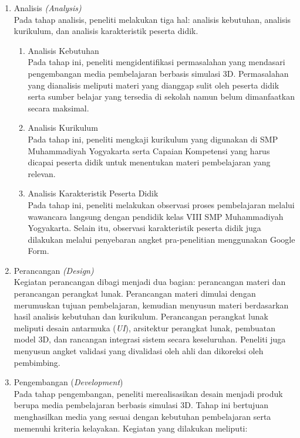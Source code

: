 \begin{enumerate}
    \item Analisis \textit{(Analysis)}\\
    \hspace*{1cm}Pada tahap analisis, peneliti melakukan tiga hal: analisis kebutuhan, analisis kurikulum, dan analisis karakteristik peserta didik.
    \begin{enumerate}
        \item Analisis Kebutuhan\\
        \hspace*{1cm}Pada tahap ini, peneliti mengidentifikasi permasalahan yang mendasari pengembangan media pembelajaran berbasis simulasi 3D. Permasalahan yang dianalisis meliputi materi yang dianggap sulit oleh peserta didik serta sumber belajar yang tersedia di sekolah namun belum dimanfaatkan secara maksimal.
        \item Analisis Kurikulum\\
        \hspace*{1cm}Pada tahap ini, peneliti mengkaji kurikulum yang digunakan di SMP Muhammadiyah Yogyakarta serta Capaian Kompetensi yang harus dicapai peserta didik untuk menentukan materi pembelajaran yang relevan.
        \item Analisis Karakteristik Peserta Didik\\
        \hspace*{1cm}Pada tahap ini, peneliti melakukan observasi proses pembelajaran melalui wawancara langsung dengan pendidik kelas VIII SMP Muhammadiyah Yogyakarta. Selain itu, observasi karakteristik peserta didik juga dilakukan melalui penyebaran angket pra-penelitian menggunakan Google Form.
    \end{enumerate}
    \item Perancangan \textit{(Design)}\\
    \hspace*{1cm}Kegiatan perancangan dibagi menjadi dua bagian: perancangan materi dan perancangan perangkat lunak. Perancangan materi dimulai dengan merumuskan tujuan pembelajaran, kemudian menyusun materi berdasarkan hasil analisis kebutuhan dan kurikulum. Perancangan perangkat lunak meliputi desain antarmuka (\textit{UI}), arsitektur perangkat lunak, pembuatan model 3D, dan rancangan integrasi sistem secara keseluruhan. Peneliti juga menyusun angket validasi yang divalidasi oleh ahli dan dikoreksi oleh pembimbing.
    \newpage
    \item Pengembangan (\textit{Development})\\
\hspace*{1cm}Pada tahap pengembangan, peneliti merealisasikan desain menjadi produk berupa media pembelajaran berbasis simulasi 3D. Tahap ini bertujuan menghasilkan media yang sesuai dengan kebutuhan pembelajaran serta memenuhi kriteria kelayakan. Kegiatan yang dilakukan meliputi:


\end{enumerate}
